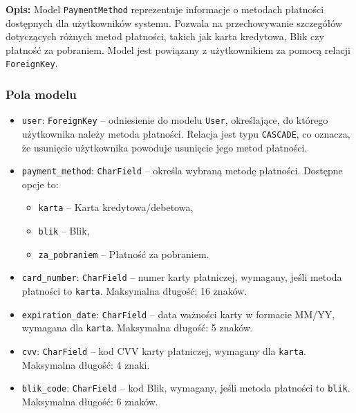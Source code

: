 \documentclass[12pt,a4paper,oneside]{article}
\theoremstyle{definition}
\numberwithin{equation}{section}
\begin{document}
\textbf{Opis:}  
Model \texttt{PaymentMethod} reprezentuje informacje o metodach płatności dostępnych dla użytkowników systemu. Pozwala na przechowywanie szczegółów dotyczących różnych metod płatności, takich jak karta kredytowa, Blik czy płatność za pobraniem. Model jest powiązany z użytkownikiem za pomocą relacji \texttt{ForeignKey}.

\subsubsection{Pola modelu}
\begin{itemize}
    \item \texttt{user}: \texttt{ForeignKey} – odniesienie do modelu \texttt{User}, określające, do którego użytkownika należy metoda płatności. Relacja jest typu \texttt{CASCADE}, co oznacza, że usunięcie użytkownika powoduje usunięcie jego metod płatności.
    \item \texttt{payment\_method}: \texttt{CharField} – określa wybraną metodę płatności. Dostępne opcje to:
    \begin{itemize}
        \item \texttt{karta} – Karta kredytowa/debetowa,
        \item \texttt{blik} – Blik,
        \item \texttt{za\_pobraniem} – Płatność za pobraniem.
    \end{itemize}
    \item \texttt{card\_number}: \texttt{CharField} – numer karty płatniczej, wymagany, jeśli metoda płatności to \texttt{karta}. Maksymalna długość: 16 znaków.
    \item \texttt{expiration\_date}: \texttt{CharField} – data ważności karty w formacie MM/YY, wymagana dla \texttt{karta}. Maksymalna długość: 5 znaków.
    \item \texttt{cvv}: \texttt{CharField} – kod CVV karty płatniczej, wymagany dla \texttt{karta}. Maksymalna długość: 4 znaki.
    \item \texttt{blik\_code}: \texttt{CharField} – kod Blik, wymagany, jeśli metoda płatności to \texttt{blik}. Maksymalna długość: 6 znaków.
\end{itemize}
\end{document}
